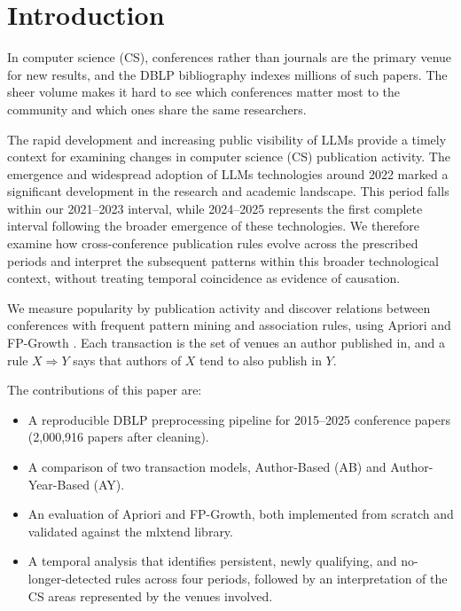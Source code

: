 \documentclass[conference]{IEEEtran}
\begin{document}
\section{Introduction}
In computer science (CS), conferences rather than journals are the primary venue for new results, and the DBLP bibliography \cite{dblp} indexes millions of such papers. The sheer volume makes it hard to see which conferences matter most to the community and which ones share the same researchers.

The rapid development and increasing public visibility of LLMs provide a timely context for examining changes in computer science (CS) publication activity. The emergence and widespread adoption of LLMs technologies around 2022 marked a significant development in the research and academic landscape. This period falls within our 2021–2023 interval, while 2024–2025 represents the first complete interval following the broader emergence of these technologies. We therefore examine how cross-conference publication rules evolve across the prescribed periods and interpret the subsequent patterns within this broader technological context, without treating temporal coincidence as evidence of causation.

We measure popularity by publication activity and discover relations between conferences with frequent pattern mining and association rules, using Apriori \cite{apriori} and FP-Growth \cite{fpgrowth}. Each transaction is the set of venues an author published in, and a rule $X \Rightarrow Y$ says that authors of $X$ tend to also publish in $Y$.

The contributions of this paper are:
\begin{itemize}
\item A reproducible DBLP preprocessing pipeline for 2015--2025 conference papers (2,000,916 papers after cleaning).
\item A comparison of two transaction models, Author-Based (AB) and Author-Year-Based (AY).
\item An evaluation of Apriori and FP-Growth, both implemented from scratch and validated against the mlxtend library.
\item A temporal analysis that identifies persistent, newly qualifying, and no-longer-detected rules across four periods, followed by an interpretation of the CS areas represented by the venues involved.
\end{itemize}
\end{document}
